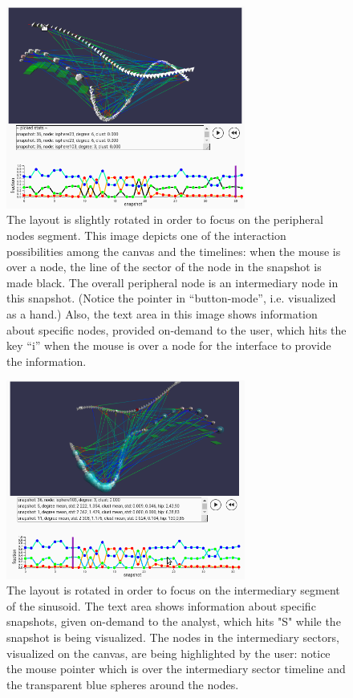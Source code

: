 \documentclass[runningheads]{llncs}
\begin{document}
\begin{figure}[!h]\centering
\includegraphics[width=0.7\textwidth]{esfNetVis3b}
  \caption{The layout is slightly rotated in order to focus on the peripheral nodes segment. This image depicts one of the interaction possibilities among the canvas and the timelines: when the mouse is over a node, the line of the sector of the node in the snapshot is made black.
  The overall peripheral node is an intermediary node in this snapshot.
  (Notice the pointer in ``button-mode'', i.e. visualized as a hand.)
  Also, the text area in this image shows information about specific nodes, provided on-demand to the user, which hits the key ``i'' when the mouse is over a node for the interface to provide the information. 
  }\label{env3}
\end{figure}

\begin{figure}[!h]\centering
\includegraphics[width=0.7\textwidth]{esfNetVis4b}
  \caption{
  The layout is rotated in order to focus on the intermediary segment of the sinusoid.
  The text area shows information about specific snapshots, given on-demand to the analyst, which hits "S" while the snapshot is being visualized.
  The nodes in the intermediary sectors, visualized on the canvas,
  are being highlighted by the user: notice the mouse pointer which is over the intermediary sector timeline and the transparent blue spheres around the nodes.
  }\label{env4}
\end{figure}
\end{document}
